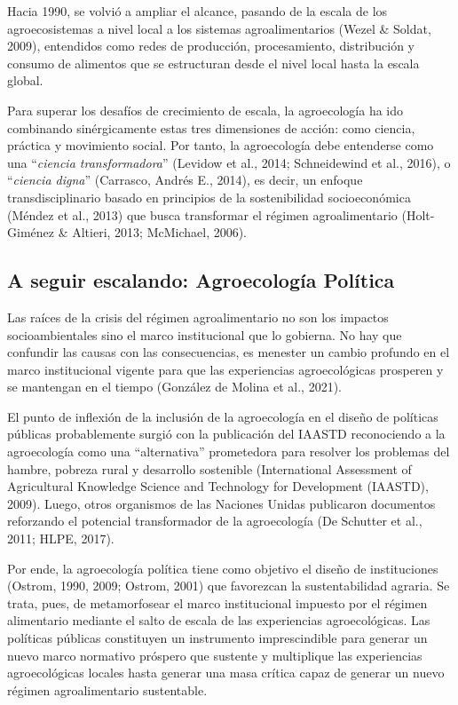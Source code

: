 \documentclass[a4paper, nobind]{templates/ociamthesis}
\begin{document}
Hacia 1990, se volvió a ampliar el alcance, pasando de la escala de los
agroecosistemas a nivel local a los sistemas agroalimentarios
(Wezel \& Soldat, 2009), entendidos como redes de producción, procesamiento,
distribución y consumo de alimentos que se estructuran desde el nivel
local hasta la escala global.

Para superar los desafíos de crecimiento de escala, la agroecología ha
ido combinando sinérgicamente estas tres dimensiones de acción: como
ciencia, práctica y movimiento social. Por tanto, la agroecología debe
entenderse como una ``\emph{ciencia transformadora}'' (Levidow et al., 2014; Schneidewind et al., 2016), o ``\emph{ciencia digna}'' (Carrasco, Andrés E., 2014),
es decir, un enfoque transdisciplinario basado en principios de la
sostenibilidad socioeconómica (Méndez et al., 2013) que busca transformar el
régimen agroalimentario (Holt-Giménez \& Altieri, 2013; McMichael, 2006).

\hypertarget{agroecologia_politica}{%
\subsection{A seguir escalando: Agroecología Política}\label{agroecologia_politica}}

Las raíces de la crisis del régimen agroalimentario no son los impactos
socioambientales sino el marco institucional que lo gobierna. No hay que
confundir las causas con las consecuencias, es menester un cambio
profundo en el marco institucional vigente para que las experiencias
agroecológicas prosperen y se mantengan en el tiempo (González de Molina et al., 2021).

El punto de inflexión de la inclusión de la agroecología en el diseño de
políticas públicas probablemente surgió con la publicación del IAASTD
reconociendo a la agroecología como una ``alternativa'' prometedora para
resolver los problemas del hambre, pobreza rural y desarrollo sostenible
(International Assessment of Agricultural Knowledge Science and Technology for Development (IAASTD), 2009). Luego, otros organismos de las Naciones Unidas publicaron
documentos reforzando el potencial transformador de la agroecología
(De Schutter et al., 2011; HLPE, 2017).

Por ende, la agroecología política tiene como objetivo el diseño de
instituciones (Ostrom, 1990, 2009; Ostrom, 2001)
que favorezcan la sustentabilidad agraria. Se trata, pues, de
metamorfosear el marco institucional impuesto por el régimen alimentario
mediante el salto de escala de las experiencias agroecológicas. Las
políticas públicas constituyen un instrumento imprescindible para
generar un nuevo marco normativo próspero que sustente y multiplique las
experiencias agroecológicas locales hasta generar una masa crítica capaz
de generar un nuevo régimen agroalimentario sustentable.
\end{document}
